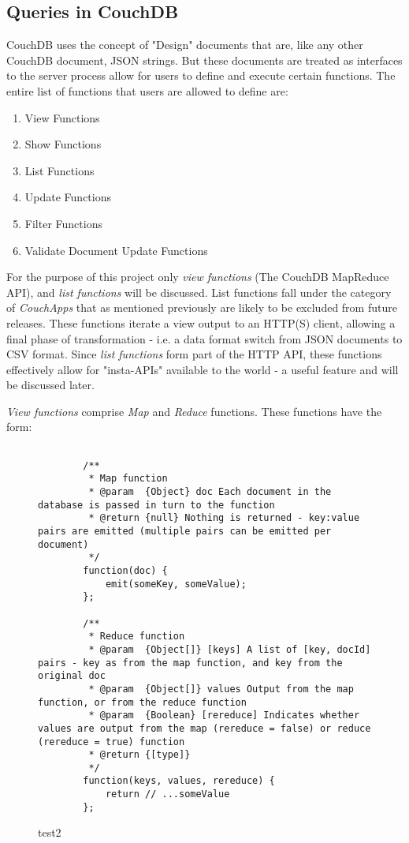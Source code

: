 \subsection{Queries in CouchDB}

CouchDB uses the concept of "Design" documents that are, like any other CouchDB document, JSON strings. But these documents are treated as interfaces to the server process allow for users to define and execute certain functions. The entire list of functions that users are allowed to define are:

\begin{enumerate}
    \item View Functions
    \item Show Functions
    \item List Functions
    \item Update Functions
    \item Filter Functions
    \item Validate Document Update Functions
\end{enumerate}

For the purpose of this project only \textit{view functions} (The CouchDB MapReduce API), and \textit{list functions} will be discussed. List functions fall under the category of \textit{CouchApps} that as mentioned previously are likely to be excluded from future releases. These functions iterate a view output to an HTTP(S) client, allowing a final phase of transformation - i.e. a data format switch from JSON documents to CSV format. Since \textit{list functions} form part of the HTTP API, these functions effectively allow for "insta-APIs" available to the world - a useful feature and will be discussed later.

\textit{View functions} comprise \textit{Map} and \textit{Reduce} functions. These functions have the form:

\begin{figure}[h]
    \centering
    \begin{verbatim} 

        /**
         * Map function
         * @param  {Object} doc Each document in the database is passed in turn to the function
         * @return {null} Nothing is returned - key:value pairs are emitted (multiple pairs can be emitted per document)
         */
        function(doc) {
            emit(someKey, someValue);
        };

        /**
         * Reduce function
         * @param  {Object[]} [keys] A list of [key, docId] pairs - key as from the map function, and key from the original doc
         * @param  {Object[]} values Output from the map function, or from the reduce function
         * @param  {Boolean} [rereduce] Indicates whether values are output from the map (rereduce = false) or reduce (rereduce = true) function
         * @return {[type]}
         */
        function(keys, values, rereduce) {
            return // ...someValue
        };
    \end{verbatim}
    \caption[test1]{test2}
    \label{couchmapreduce}
\end{figure}

